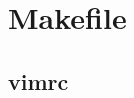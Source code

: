 \documentclass[letterpaper,landscape]{article}
\begin{document}
\begin{multicols}{3}
    \tableofcontents
\end{multicols}
\clearpage

\section{Makefile}
\begin{multicols}{3}
    

    \section{vimrc}
    

    \clearpage
\end{multicols}
\printindex
\end{document}
